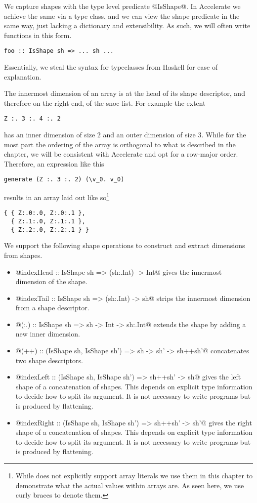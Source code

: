 We capture shapes with the type level predicate @IsShape@. In Accelerate we achieve the same via a type class, and we can view the shape predicate in the same way, just lacking a dictionary and extensibility. As such, we will often write functions in this form.
%
\begin{lstlisting}
foo :: IsShape sh => ... sh ...
\end{lstlisting}
%
Essentially, we steal the syntax for typeclasses from Haskell for ease of explanation.

The innermost dimension of an array is at the head of its shape descriptor, and therefore on the right end, of the snoc-list. For example the extent
%
\begin{lstlisting}
Z :. 3 :. 4 :. 2
\end{lstlisting}
%
has an inner dimension of size 2 and an outer dimension of size 3. While for the most part the ordering of the array is orthogonal to what is described in the chapter, we will be consistent with Accelerate and opt for a row-major order. Therefore, an expression like this
%
\begin{lstlisting}
generate (Z :. 3 :. 2) (\v_0. v_0)
\end{lstlisting}
%
results in an array laid out like so\footnote{While \ndp{} does not explicitly support array literals we use them in this chapter to demonstrate what the actual values within arrays are. As seen here, we use curly braces to denote them.}
%
\begin{lstlisting}
{ { Z:.0:.0, Z:.0:.1 },
  { Z:.1:.0, Z:.1:.1 },
  { Z:.2:.0, Z:.2:.1 } }
\end{lstlisting}

We support the following shape operations to construct and extract dimensions from shapes.

\begin{itemize}
\item{@indexHead   :: IsShape sh => (sh:.Int) -> Int@ gives the innermost dimension of the shape.}
\item{@indexTail   :: IsShape sh => (sh:.Int) -> sh@ strips the innermost dimension from a shape descriptor.}
\item{@(:.)        :: IsShape sh => sh -> Int -> sh:.Int@ extends the shape by adding a new inner dimension.}
\item{@(++)         :: (IsShape sh, IsShape sh') => sh -> sh' -> sh++sh'@ concatenates two shape descriptors.}
\item{@indexLeft   :: (IsShape sh, IsShape sh') => sh++sh' -> sh@ gives the left shape of a concatenation of shapes. This depends on explicit type information to decide how to split its argument. It is not necessary to write programs but is produced by flattening.}
\item{@indexRight :: (IsShape sh, IsShape sh') => sh++sh' -> sh'@ gives the right shape of a concatenation of shapes. This depends on explicit type information to decide how to split its argument. It is not necessary to write programs but is produced by flattening.}
\end{itemize}

